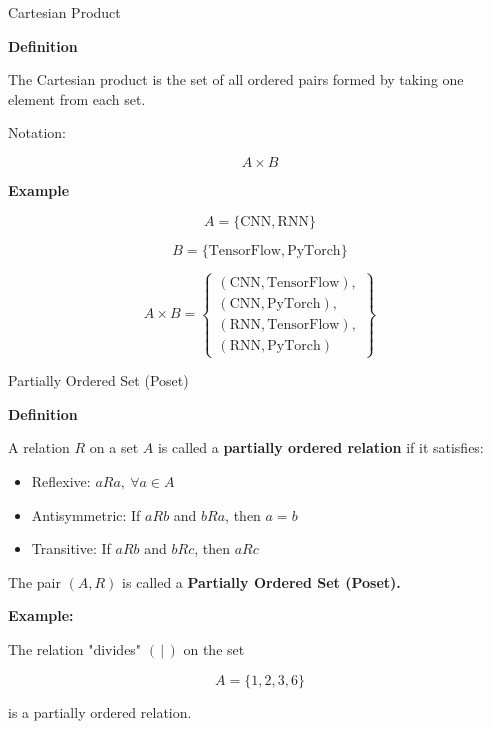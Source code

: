 \documentclass{beamer}
\begin{document}
\begin{frame}{Cartesian Product}

\small

\textbf{Definition}

The Cartesian product is the set of all ordered pairs formed by taking one element from each set.

Notation:

\[
A\times B
\]

\textbf{Example}

\[
A=\{\text{CNN},\text{RNN}\}
\]

\[
B=\{\text{TensorFlow},\text{PyTorch}\}
\]

\[
A\times B=
\left\{
\begin{array}{l}
(\text{CNN},\text{TensorFlow}),\\
(\text{CNN},\text{PyTorch}),\\
(\text{RNN},\text{TensorFlow}),\\
(\text{RNN},\text{PyTorch})
\end{array}
\right\}
\]

\end{frame}
\begin{frame}{Partially Ordered Set (Poset)}

\small

\textbf{Definition}

A relation $R$ on a set $A$ is called a \textbf{partially ordered relation}
if it satisfies:

\begin{itemize}
    \item Reflexive: $aRa,\ \forall a\in A$
    \item Antisymmetric: If $aRb$ and $bRa$, then $a=b$
    \item Transitive: If $aRb$ and $bRc$, then $aRc$
\end{itemize}

The pair $(A,R)$ is called a
\textbf{Partially Ordered Set (Poset).}

\vspace{0.2cm}

\textbf{Example:}

The relation "divides" $(\,|\,)$ on the set

\[
A=\{1,2,3,6\}
\]

is a partially ordered relation.

\end{frame}
\end{document}
